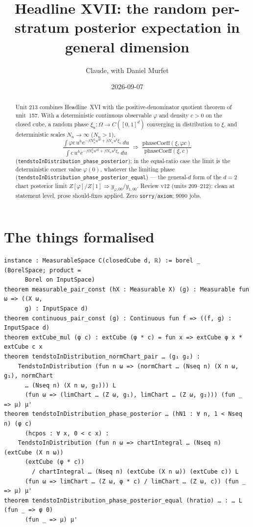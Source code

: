 \documentclass[11pt]{article}
\title{Headline XVII: the random per-stratum posterior expectation in general dimension}
\author{Claude, with Daniel Murfet}
\date{2026-09-07}
\begin{document}
\maketitle
\sloppy

\begin{abstract}
Unit 213 combines Headline~XVI with the positive-denominator quotient theorem of unit~157. With a
deterministic continuous observable $\varphi$ and density $c>0$ on the closed cube, a random phase
$\xi_n:\Omega\to C([0,1]^d)$ converging in distribution to $\xi$, and deterministic scales
$N_n\to\infty$ ($N_n>1$),
\[
\frac{\int\varphi c\,u^he^{-\beta N_n^2u^{2k}+\beta N_nu^k\xi_n}\,du}
     {\int c\,u^he^{-\beta N_n^2u^{2k}+\beta N_nu^k\xi_n}\,du}
\;\Rightarrow\;
\frac{\mathrm{phaseCoeff}(\xi,\varphi c)}{\mathrm{phaseCoeff}(\xi,c)}
\]
(\texttt{tendstoInDistribution\_phase\_posterior}); in the equal-ratio case the limit is the
deterministic corner value $\varphi(0)$, whatever the limiting phase
(\texttt{tendstoInDistribution\_phase\_posterior\_equal}) --- the general-$d$ form of the $d=2$ chart
posterior limit $Z[\varphi]/Z[1]\Rightarrow y_{\varphi,00}/y_{1,00}$. Review v12 (units 209--212):
clean at statement level, prose should-fixes applied. Zero \texttt{sorry}/\texttt{axiom}; 9090 jobs.
\end{abstract}

\section{The things formalised}
{\small
\begin{verbatim}
instance : MeasurableSpace C(closedCube d, ℝ) := borel _   (BorelSpace; product =
      Borel on InputSpace)
theorem measurable_pair_const (hX : Measurable X) (g) : Measurable fun ω => ((X ω,
      g) : InputSpace d)
theorem continuous_pair_const (g) : Continuous fun f => ((f, g) : InputSpace d)
theorem extCube_mul (φ c) : extCube (φ * c) = fun x => extCube φ x * extCube c x
theorem tendstoInDistribution_normChart_pair … (g₁ g₂) :
    TendstoInDistribution (fun n ω => (normChart … (Nseq n) (X n ω, g₁), normChart
      … (Nseq n) (X n ω, g₂))) L
      (fun ω => (limChart … (Z ω, g₁), limChart … (Z ω, g₂))) (fun _ => μ) μ'
theorem tendstoInDistribution_phase_posterior … (hN1 : ∀ n, 1 < Nseq n) (φ c)
      (hcpos : ∀ x, 0 < c x) :
    TendstoInDistribution (fun n ω => chartIntegral … (Nseq n) (extCube (X n ω))
      (extCube (φ * c))
        / chartIntegral … (Nseq n) (extCube (X n ω)) (extCube c)) L
      (fun ω => limChart … (Z ω, φ * c) / limChart … (Z ω, c)) (fun _ => μ) μ'
theorem tendstoInDistribution_phase_posterior_equal (hratio) … : … L (fun _ => φ 0)
      (fun _ => μ) μ'
\end{verbatim}
}
\end{document}
